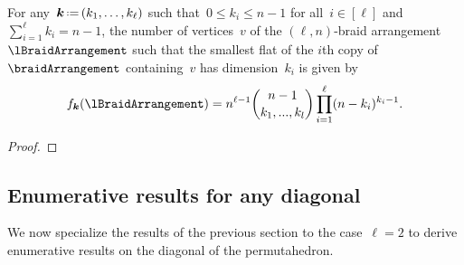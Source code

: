 \begin{theorem}
\label{thm:verticesRefinedlnBraidArrangement}
For any~$\b{k} \eqdef (k_1, \dots, k_\ell)$ such that~$0 \le k_i \le n-1$ for all~$i \in [\ell]$ and~$\sum_{i=1}^\ell k_i = n-1$, the number of vertices~$v$ of the $(\ell,n)$-braid arrangement~$\lBraidArrangement$ such that the smallest flat of the $i$th copy of~$\braidArrangement$ containing~$v$ has dimension~$k_i$ is given by
\[
f_{\b{k}}(\lBraidArrangement) = n^{\ell-1}  \binom{n-1}{k_1, ..., k_l} \prod_{i=1}^\ell (n-k_i)^{k_i-1}.
\]
\end{theorem}

\begin{proof}
\end{proof}



\subsection{Enumerative results for any diagonal} 
\label{s:facets}

We now specialize the results of the previous section to the case~$\ell = 2$ to derive enumerative results on the diagonal of the permutahedron.

